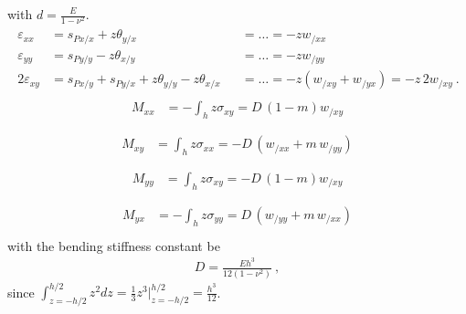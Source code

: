 \documentclass[letterpaper,10pt,english]{jupyterBook}
\begin{document}
\sphinxAtStartPar
with \(d = \frac{E}{1 - \nu^2}\).
\begin{equation*}
\begin{split}\begin{aligned}
   \varepsilon_{xx} & = s_{Px/x} + z \theta_{y/x}                             && = \dots = - z w_{/xx}  \\
   \varepsilon_{yy} & = s_{Py/y} - z \theta_{x/y}                             && = \dots = - z w_{/yy}  \\
 2 \varepsilon_{xy} & = s_{Px/y} + s_{Py/x} + z \theta_{y/y} - z \theta_{x/x} && = \dots = - z ( w_{/xy} + w_{/yx}) = - z \, 2 w_{/xy} \ .
\end{aligned}\end{split}
\end{equation*}\begin{equation*}
\begin{split}\begin{aligned}
  M_{xx}
  & = - \int_{h} z \sigma_{xy} = D \, ( 1 - m ) w_{/xy}  \\
\end{aligned}\end{split}
\end{equation*}\begin{equation*}
\begin{split}\begin{aligned}
  M_{xy}
  & =   \int_{h} z \sigma_{xx} = - D \, ( w_{/xx} + m \, w_{/yy} )  \\
\end{aligned}\end{split}
\end{equation*}\begin{equation*}
\begin{split}\begin{aligned}
  M_{yy}
  & = \int_{h} z \sigma_{xy} = - D \, ( 1 - m ) w_{/xy}  \\
\end{aligned}\end{split}
\end{equation*}\begin{equation*}
\begin{split}\begin{aligned}
  M_{yx}
  & = - \int_{h} z \sigma_{yy} = D \, ( w_{/yy} + m \, w_{/xx} )  \\
\end{aligned}\end{split}
\end{equation*}
\sphinxAtStartPar
with the bending stiffness constant be
\begin{equation*}
\begin{split}D = \frac{E h^3}{12(1-\nu^2)} \ ,\end{split}
\end{equation*}
\sphinxAtStartPar
since \(\int_{z=-h/2}^{h/2} z^2 dz = \frac{1}{3} z^3 \Big|_{z=-h/2}^{h/2} = \frac{h^3}{12}\).
\end{document}
